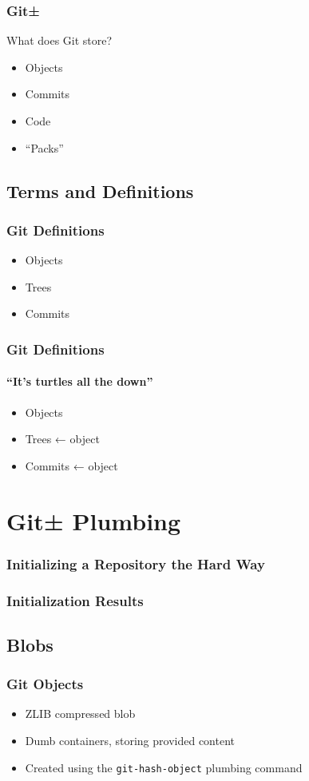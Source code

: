 \documentclass{beamer}
\begin{document}
\begin{frame}
\frametitle{Git±}
What does Git store?
\begin{itemize}
\item<2-6>{Objects}
\item<3-5>{Commits}
\item<4-5>{Code}
\item<5-5>{``Packs''}
\end{itemize}
\end{frame}

\subsection{Terms and Definitions}
\begin{frame}
\frametitle{Git Definitions}
\begin{itemize}
\item{Objects}
\item{Trees}
\item{Commits}
\end{itemize}
\end{frame}

\begin{frame}
\frametitle{Git Definitions}
\framesubtitle{``It's turtles all the down''}
\begin{itemize}
\item{Objects}
\item{Trees ← object}
\item{Commits ← object}
\end{itemize}
\end{frame}

\section{Git± Plumbing}

\begin{frame}[fragile]
\frametitle{Initializing a Repository the Hard Way}

\end{frame}

\begin{frame}[fragile]
\frametitle{Initialization Results}

\end{frame}

\subsection{Blobs}
\begin{frame}
\frametitle{Git Objects}
\begin{itemize}
\item{ZLIB compressed blob}
\item{Dumb containers, storing provided content}
\item{Created using the \texttt{git-hash-object} plumbing command}
\end{itemize}
\end{frame}
\end{document}
